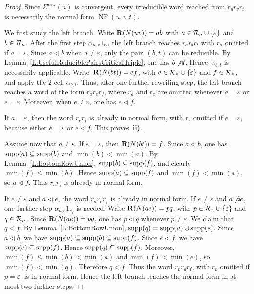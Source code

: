 \documentclass[a4paper, twoside, 11pt, english]{article}
\begin{document}
\begin{proof}
Since $\Sigma^{\mathrm{row}}(n)$ is convergent, every irreducible word reached
from $r_u r_v r_t$ is necessarily the normal form
$\operatorname{NF}(u,v,t)$.

We first study the left branch.
Write $\mathbf{R}(N(uv))=ab$ with $a\in\mathcal{R}_n\cup\{\varepsilon\}$ and $b\in\mathcal{R}_n$.
After the first step $\alpha_{u,v}1_{r_t}$, the left branch reaches 
$r_a r_b r_t$ with $r_a$ omitted if $a=\varepsilon$.
Since $a\triangleleft b$ when $a\neq\varepsilon$, only the pair~$(b,t)$ 
can be reducible.
By Lemma~\ref{L:UsefulReduciblePairsCriticalTriple}, one has
$b\not\triangleleft t$. Hence~$\alpha_{b,t}$ is necessarily applicable. Write~$\mathbf{R}(N(bt))=ef$,
with $e\in\mathcal{R}_n\cup\{\varepsilon\}$ and $f\in\mathcal{R}_n$, and apply the $2$-cell
$\alpha_{b,t}$. Thus, after  one further rewriting step, the left
branch reaches a word of the form $r_a r_e r_f$, where $r_a$ and $r_e$ are
omitted whenever $a=\varepsilon$ or $e=\varepsilon$. Moreover, when
$e\neq\varepsilon$, one has $e\triangleleft f$.

If $a=\varepsilon$, then the word $r_e r_f$ is already in normal form, with
$r_e$ omitted if $e=\varepsilon$, because either $e=\varepsilon$ or
$e\triangleleft f$. This proves~{\bf ii)}.

Assume now that $a\neq\varepsilon$.
If $e=\varepsilon$, then $\mathbf{R}(N(bt))=f$. Since $a\triangleleft b$, one has
$\operatorname{supp}(a)\subseteq\operatorname{supp}(b)$ and $\min(b)<\min(a)$. By
Lemma~\ref{L:BottomRowUnion}, $\operatorname{supp}(b)\subseteq\operatorname{supp}(f)$, and clearly
$\min(f)\leq \min(b)$. Hence $\operatorname{supp}(a)\subseteq\operatorname{supp}(f)$ and
$\min(f)<\min(a)$, so $a\triangleleft f$. Thus $r_a r_f$ is already in
normal form.

If $e\neq\varepsilon$ and $a\triangleleft e$, the word $r_a r_e r_f$ is
already in normal form.
If $e\neq\varepsilon$ and $a\not\triangleleft e$, one further step
$\alpha_{a,e}1_{r_f}$ is needed. Write $\mathbf{R}(N(ae))=pq$, with
$p\in\mathcal{R}_n\cup\{\varepsilon\}$ and $q\in\mathcal{R}_n$.
Since $\mathbf{R}(N(ae))=pq$, one has $p\triangleleft q$ whenever
$p\neq\varepsilon$. We claim that $q\triangleleft f$.
By Lemma~\ref{L:BottomRowUnion}, $\operatorname{supp}(q)=\operatorname{supp}(a)\cup\operatorname{supp}(e)$.
Since $a\triangleleft b$, we have
$\operatorname{supp}(a)\subseteq\operatorname{supp}(b)\subseteq\operatorname{supp}(f)$.
Since $e\triangleleft f$, we have $\operatorname{supp}(e)\subseteq\operatorname{supp}(f)$.
Hence $\operatorname{supp}(q)\subseteq\operatorname{supp}(f)$.
Moreover, $\min(f)\le\min(b)<\min(a)$ and $\min(f)<\min(e)$, so
$\min(f)<\min(q)$. Therefore $q\triangleleft f$.
Thus the word $r_p r_q r_f$, with $r_p$ omitted if $p=\varepsilon$, is in
normal form. Hence the left branch reaches the normal form in at most two
further steps.


\end{proof}
\end{document}
